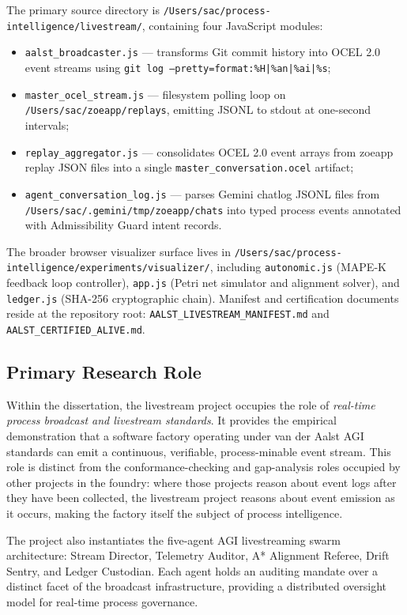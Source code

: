 The primary source directory is \texttt{/Users/sac/process-intelligence/livestream/},
containing four JavaScript modules:
\begin{itemize}
  \item \texttt{aalst\_broadcaster.js} --- transforms Git commit history into OCEL 2.0
    event streams using \texttt{git log --pretty=format:\%H|\%an|\%ai|\%s};
  \item \texttt{master\_ocel\_stream.js} --- filesystem polling loop on
    \texttt{/Users/sac/zoeapp/replays}, emitting JSONL to stdout at one-second intervals;
  \item \texttt{replay\_aggregator.js} --- consolidates OCEL 2.0 event arrays from
    zoeapp replay JSON files into a single \texttt{master\_conversation.ocel} artifact;
  \item \texttt{agent\_conversation\_log.js} --- parses Gemini chatlog JSONL files
    from \texttt{/Users/sac/.gemini/tmp/zoeapp/chats} into typed process events
    annotated with Admissibility Guard intent records.
\end{itemize}

The broader browser visualizer surface lives in
\texttt{/Users/sac/process-intelligence/experiments/visualizer/}, including
\texttt{autonomic.js} (MAPE-K feedback loop controller), \texttt{app.js} (Petri net
simulator and alignment solver), and \texttt{ledger.js} (SHA-256 cryptographic chain).
Manifest and certification documents reside at the repository root:
\texttt{AALST\_LIVESTREAM\_MANIFEST.md} and \texttt{AALST\_CERTIFIED\_ALIVE.md}.

\subsection{Primary Research Role}
\label{sec:livestream-identity-role}

Within the dissertation, the livestream project occupies the role of
\emph{real-time process broadcast and livestream standards}. It provides the empirical
demonstration that a software factory operating under van der Aalst AGI standards can
emit a continuous, verifiable, process-minable event stream. This role is distinct from
the conformance-checking and gap-analysis roles occupied by other projects in the
foundry: where those projects reason about event logs after they have been collected,
the livestream project reasons about event emission as it occurs, making the factory
itself the subject of process intelligence.

The project also instantiates the five-agent AGI livestreaming swarm architecture:
Stream Director, Telemetry Auditor, A* Alignment Referee, Drift Sentry, and Ledger
Custodian. Each agent holds an auditing mandate over a distinct facet of the broadcast
infrastructure, providing a distributed oversight model for real-time process governance.


